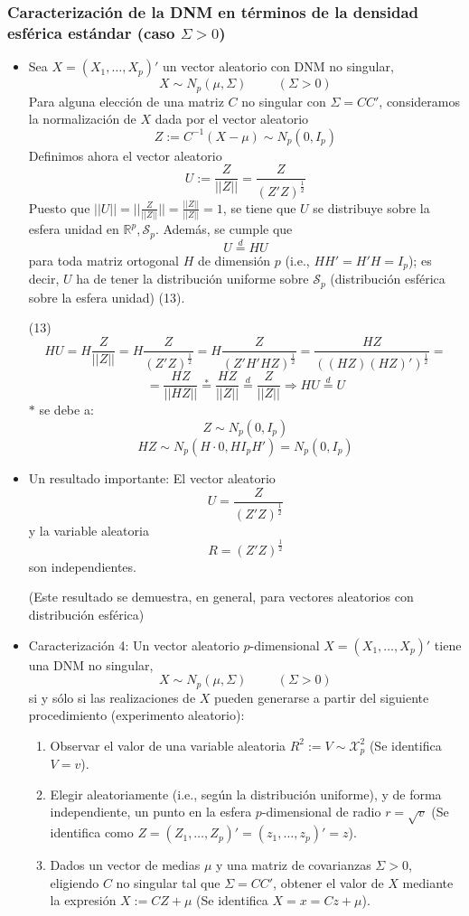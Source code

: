 \documentclass[11pt,a4paper]{article}
\begin{document}
\subsubsection{Caracterización de la DNM en términos de la densidad esférica estándar (caso \texorpdfstring{$\Sigma > 0$}))}
\begin{itemize}
\item Sea $X = (X_{1}, \dots, X_{p})'$ un vector aleatorio con DNM no singular,
$$X \sim N_{p}(\mu, \Sigma) \hspace{1cm} (\Sigma > 0)$$
Para alguna elección de una matriz $C$ no singular con $\Sigma = CC'$, consideramos la normalización de $X$ dada por el vector aleatorio
$$Z := C^{-1}(X - \mu) \sim N_{p}(0, I_{p})$$
Definimos ahora el vector aleatorio
$$U := \frac{Z}{||Z||} = \frac{Z}{(Z'Z)^{\frac{1}{2}}}$$
Puesto que $||U|| = ||\frac{Z}{||Z||}|| = \frac{||Z||}{||Z||} = 1$, se tiene que $U$ se distribuye sobre la esfera unidad en $\mathbb{R}^{p}, \mathcal{S}_{p}$. Además, se cumple que
$$U \overset{d}{=} HU$$
para toda matriz ortogonal $H$ de dimensión $p$ (i.e., $HH' = H'H = I_{p}$); es decir, $U$ ha de tener la distribución uniforme sobre $\mathcal{S}_{p}$ (distribución esférica sobre la esfera unidad) (13).

\item[(13)] $$HU = H \frac{Z}{||Z||} = H \frac{Z}{(Z'Z)^{\frac{1}{2}}} = H \frac{Z}{(Z'H'HZ)^{\frac{1}{2}}} = \frac{HZ}{((HZ)(HZ)')^{\frac{1}{2}}} =$$
$$= \frac{HZ}{||HZ||} \overset{*}{=} \frac{HZ}{||Z||} \overset{d}{=} \frac{Z}{||Z||} \Rightarrow HU \overset{d}{=} U$$
$*$ se debe a:
$$Z \sim N_{p}(0, I_{p})$$
$$HZ \sim N_{p}(H \cdot 0, H I_{p} H') = N_{p}(0, I_{p})$$

\item Un resultado importante: El vector aleatorio
$$U = \frac{Z}{(Z'Z)^{\frac{1}{2}}}$$
y la variable aleatoria
$$R = (Z'Z)^{\frac{1}{2}}$$
son independientes.

(Este resultado se demuestra, en general, para vectores aleatorios con distribución esférica)

\item Caracterización 4: Un vector aleatorio $p$-dimensional $X = (X_{1}, \dots, X_{p})'$ tiene una DNM no singular,
$$X \sim N_{p}(\mu, \Sigma) \hspace{1cm} (\Sigma > 0)$$
si y sólo si las realizaciones de $X$ pueden generarse a partir del siguiente procedimiento (experimento aleatorio):
\begin{enumerate}
\item Observar el valor de una variable aleatoria $R^{2} := V \sim \mathcal{X}_{p}^{2}$ (Se identifica $V=v$).
\item Elegir aleatoriamente (i.e., según la distribución uniforme), y de forma independiente, un punto en la esfera $p$-dimensional de radio $r = \sqrt{v}$ (Se identifica como $Z = (Z_{1}, \dots, Z_{p})' = (z_{1}, \dots, z_{p})' = z$).
\item Dados un vector de medias $\mu$ y una matriz de covarianzas $\Sigma > 0$, eligiendo $C$ no singular tal que $\Sigma = CC'$, obtener el valor de $X$ mediante la expresión $X := CZ + \mu$ (Se identifica $X = x = Cz + \mu$).
\end{enumerate}
\end{itemize}
\end{document}
